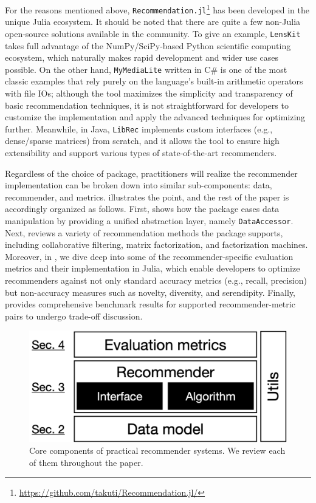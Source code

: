For the reasons mentioned above, \texttt{Recommendation.jl}\footnote{\url{https://github.com/takuti/Recommendation.jl/}} has been developed in the unique Julia ecosystem. It should be noted that there are quite a few non-Julia open-source solutions available in the community. To give an example, \texttt{LensKit} \cite{ekstrand2020lenskit} takes full advantage of the NumPy/SciPy-based Python scientific computing ecosystem, which naturally makes rapid development and wider use cases possible. On the other hand, \texttt{MyMediaLite} \cite{gantner2011mymedialite} written in C\# is one of the most classic examples that rely purely on the language's built-in arithmetic operators with file IOs; although the tool maximizes the simplicity and transparency of basic recommendation techniques, it is not straightforward for developers to customize the implementation and apply the advanced techniques for optimizing further. Meanwhile, in Java, \texttt{LibRec} \cite{guo2015librec} implements custom interfaces (e.g., dense/sparse matrices) from scratch, and it allows the tool to ensure high extensibility and support various types of state-of-the-art recommenders. 

Regardless of the choice of package, practitioners will realize the recommender implementation can be broken down into similar sub-components: data, recommender, and metrics.  illustrates the point, and the rest of the paper is accordingly organized as follows. First,  shows how the package eases data manipulation by providing a unified abstraction layer, namely \texttt{DataAccessor}. Next,  reviews a variety of recommendation methods the package supports, including collaborative filtering, matrix factorization, and factorization machines. Moreover, in , we dive deep into some of the recommender-specific evaluation metrics and their implementation in Julia, which enable developers to optimize recommenders against not only standard accuracy metrics (e.g., recall, precision) but non-accuracy measures such as novelty, diversity, and serendipity. Finally,  provides comprehensive benchmark results for supported recommender-metric pairs to undergo trade-off discussion. 

\begin{figure}[htbp]
    \centering
    \includegraphics[width=0.5\linewidth]{images/components.pdf}
    \caption{Core components of practical recommender systems. We review each of them throughout the paper.}
    \label{fig:components}
\end{figure}


